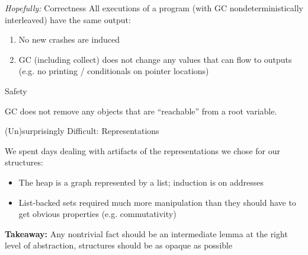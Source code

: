\documentclass{beamer}
\begin{document}
\begin{frame}{\textit{Hopefully:} Correctness}
All executions  of a program (with GC nondeterministically interleaved) have the same output:

\begin{enumerate}
\item No new crashes are induced
\item GC (including collect) does not change any values that can flow to outputs (e.g. no printing / conditionals on pointer locations)
\end{enumerate}
\end{frame}

\begin{frame}{Safety}
\begin{center}
GC does not remove any objects that are ``reachable'' from a root variable.


\end{center}
\end{frame}

\begin{frame}{(Un)surprisingly Difficult: Representations}

We spent days dealing with artifacts of the representations we chose for our structures:

\begin{itemize}
\item The heap is a graph represented by a list; induction is on addresses
\item List-backed sets required much more manipulation than they should have to get obvious properties (e.g. commutativity)
\end{itemize}

\textbf{Takeaway:} Any nontrivial fact should be an intermediate lemma at the right level of abstraction, structures should be as opaque as possible

\end{frame}
\end{document}
